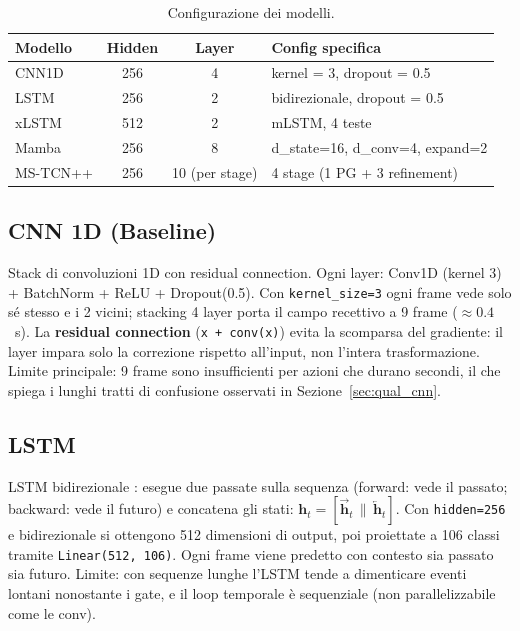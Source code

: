 \documentclass[12pt, a4paper]{article}
\begin{document}
\begin{table}[H]
\centering
\caption{Configurazione dei modelli.}
\begin{tabular}{lccl}
\toprule
\textbf{Modello} & \textbf{Hidden} & \textbf{Layer} & \textbf{Config specifica} \\
\midrule
CNN1D    & 256 & 4              & kernel = 3, dropout = 0.5 \\
LSTM     & 256 & 2              & bidirezionale, dropout = 0.5 \\
xLSTM    & 512 & 2              & mLSTM, 4 teste \\
Mamba    & 256 & 8              & d\_state=16, d\_conv=4, expand=2 \\
MS-TCN++ & 256 & 10 (per stage) & 4 stage (1 PG + 3 refinement) \\
\bottomrule
\end{tabular}
\end{table}

\subsection{CNN 1D (Baseline)}
Stack di convoluzioni 1D con residual connection. Ogni layer:
Conv1D (kernel 3) + BatchNorm + ReLU + Dropout(0.5). Con \texttt{kernel\_size=3}
ogni frame vede solo sé stesso e i 2 vicini; stacking 4 layer porta il campo
recettivo a 9 frame ($\approx 0.4$~s). La \textbf{residual connection}
(\texttt{x + conv(x)}) evita la scomparsa del gradiente: il layer impara solo
la correzione rispetto all'input, non l'intera trasformazione.
Limite principale: 9 frame sono insufficienti per azioni che durano secondi,
il che spiega i lunghi tratti di confusione osservati in Sezione~\ref{sec:qual_cnn}.

\subsection{LSTM}
LSTM bidirezionale \cite{hochreiter1997long}: esegue due passate sulla sequenza
(forward: vede il passato; backward: vede il futuro) e concatena gli stati:
$\mathbf{h}_t = [\overrightarrow{\mathbf{h}}_t \,\|\, \overleftarrow{\mathbf{h}}_t]$.
Con \texttt{hidden=256} e bidirezionale si ottengono 512 dimensioni di output,
poi proiettate a 106 classi tramite \texttt{Linear(512, 106)}.
Ogni frame viene predetto con contesto sia passato sia futuro. Limite: con
sequenze lunghe l'LSTM tende a dimenticare eventi lontani nonostante i gate, e
il loop temporale è sequenziale (non parallelizzabile come le conv).
\end{document}
